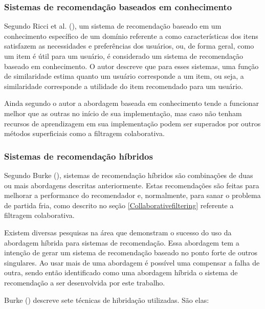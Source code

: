 \subsubsection{Sistemas de recomendação baseados em conhecimento}

Segundo Ricci et al. (\citeyear{Ricci:2010}), um sistema de recomendação baseado em um conhecimento específico de um domínio referente a como características dos itens satisfazem as necessidades e preferências dos usuários, ou, de forma geral, como um item é útil para um usuário, é considerado um sistema de recomendação baseado em conhecimento. O autor descreve que para esses sistemas, uma função de similaridade estima quanto um usuário corresponde a um item, ou seja, a similaridade corresponde a utilidade do item recomendado para um usuário.

Ainda segundo o autor a abordagem baseada em conhecimento tende a funcionar melhor que as outras no início de sua implementação, mas caso não tenham recursos de aprendizagem em sua implementação podem ser superados por outros métodos superficiais como a filtragem colaborativa.

\subsubsection{Sistemas de recomendação híbridos}
\label{Hybrid}
Segundo Burke (\citeyear{Burke:2007}), sistemas de recomendação híbridos são combinações de duas ou mais abordagens descritas anteriormente. Estas recomendações são feitas para melhorar a performance do recomendador e, normalmente, para sanar o problema de partida fria, como descrito no seção \ref{Collaborativefiltering} referente a filtragem colaborativa.

Existem diversas pesquisas na área que demonstram o sucesso do uso da abordagem híbrida para sistemas de recomendação. Essa abordagem tem a intenção de gerar um sistema de recomendação baseado no ponto forte de outros singulares. Ao usar mais de uma abordagem é possível uma compensar a falha de outra, sendo então identificado como uma abordagem híbrida o sistema de recomendação a ser desenvolvida por este trabalho.

Burke (\citeyear{Burke:2007}) descreve sete técnicas de hibridação utilizadas. São elas:

